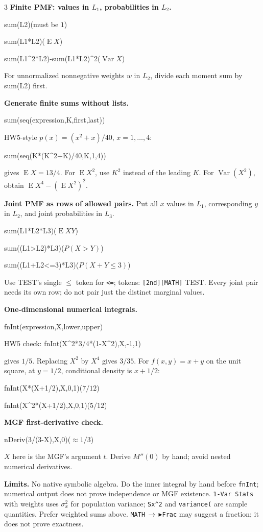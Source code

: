 \documentclass[letterpaper,landscape]{article}
\DeclareMathOperator{\E}{E}
\DeclareMathOperator{\Var}{Var}
\newcommand{\mini}[1]{{\bfseries #1}}
\newcommand{\cmd}[1]{{\ttfamily\fontsize{7.6}{8.7}\selectfont #1}}
\begin{document}
\begin{multicols*}{3}
\mini{Finite PMF: values in $L_1$, probabilities in $L_2$.}
\par\cmd{sum(L2)}\quad (must be $1$)
\par\cmd{sum(L1*L2)}\quad ($\E X$)
\par\cmd{sum(L1\string^2*L2)-sum(L1*L2)\string^2}\quad ($\Var X$)
\par For unnormalized nonnegative weights $w$ in $L_2$, divide each moment sum by \cmd{sum(L2)} first.

\mini{Generate finite sums without lists.}
\par\cmd{sum(seq(expression,K,first,last))}
\par HW5-style $p(x)=(x^2+x)/40$, $x=1,\ldots,4$:
\par\cmd{sum(seq(K*(K\string^2+K)/40,K,1,4))}
\par gives $\E X=13/4$. For $\E X^2$, use $K^2$ instead of the leading $K$. For $\Var(X^2)$, obtain $\E X^4-(\E X^2)^2$.

\mini{Joint PMF as rows of allowed pairs.}
Put all $x$ values in $L_1$, corresponding $y$ in $L_2$, and joint probabilities in $L_3$.
\par\cmd{sum(L1*L2*L3)}\quad ($\E XY$)
\par\cmd{sum((L1>L2)*L3)}\quad ($P(X>Y)$)
\par\cmd{sum((L1+L2<=3)*L3)}\quad ($P(X+Y\le3)$)
\par Use TEST's single $\le$ token for \texttt{<=}; tokens: \texttt{[2nd][MATH]} TEST. Every joint pair needs its own row; do not pair just the distinct marginal values.

\mini{One-dimensional numerical integrals.}
\par\cmd{fnInt(expression,X,lower,upper)}
\par HW5 check: \cmd{fnInt(X\string^2*3/4*(1-X\string^2),X,-1,1)}
\par gives $1/5$. Replacing $X^2$ by $X^4$ gives $3/35$.
For $f(x,y)=x+y$ on the unit square, at $y=1/2$, conditional density is $x+1/2$:
\par\cmd{fnInt(X*(X+1/2),X,0,1)}\quad ($7/12$)
\par\cmd{fnInt(X\string^2*(X+1/2),X,0,1)}\quad ($5/12$)

\mini{MGF first-derivative check.}
\par\cmd{nDeriv(3/(3-X),X,0)}\quad ($\approx1/3$)
\par $X$ here is the MGF's argument $t$. Derive $M''(0)$ by hand; avoid nested numerical derivatives.

\mini{Limits.} No native symbolic algebra. Do the inner integral by hand before \texttt{fnInt}; numerical output does not prove independence or MGF existence. \texttt{1-Var Stats} with weights uses $\sigma_x^2$ for population variance; \texttt{Sx\string^2} and \texttt{variance(} are sample quantities. Prefer weighted sums above. \texttt{MATH}\,$\to$\,$\blacktriangleright$\texttt{Frac} may suggest a fraction; it does not prove exactness.
\end{multicols*}
\end{document}
